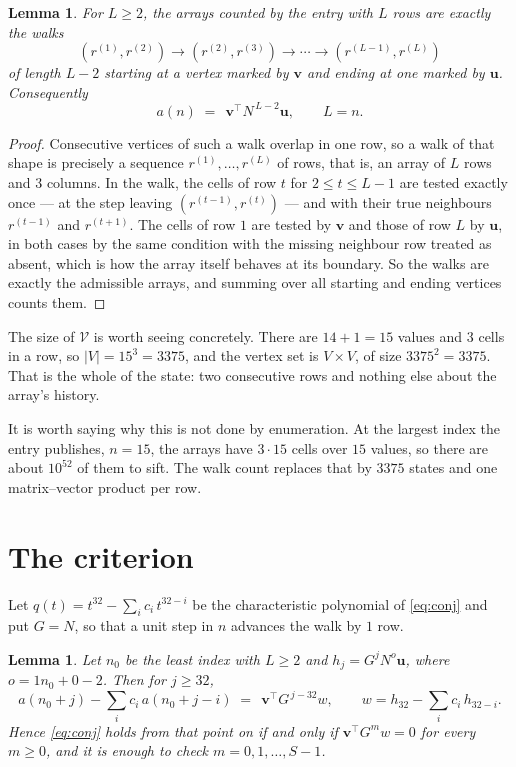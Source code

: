 \documentclass[11pt,a4paper]{article}
\theoremstyle{plain}
\newtheorem{lemma}[theorem]{Lemma}
\theoremstyle{definition}
\begin{document}
\begin{lemma}\label{lem:walk}
For $L\ge2$, the arrays counted by the entry with $L$ rows are exactly the walks
\[
(r^{(1)},r^{(2)})\to(r^{(2)},r^{(3)})\to\cdots\to(r^{(L-1)},r^{(L)})
\]
of length $L-2$ starting at a vertex marked by $\mathbf{v}$ and ending at one marked by
$\mathbf{u}$. Consequently
\[
a(n)\;=\;\,\mathbf{v}^{\!\top}N^{\,L-2}\mathbf{u},\qquad L=n .
\]
\end{lemma}

\begin{proof}
Consecutive vertices of such a walk overlap in one row, so a walk of that shape is
precisely a sequence $r^{(1)},\dots,r^{(L)}$ of rows, that is, an array of $L$ rows
and $3$ columns. In the walk, the cells of row $t$ for $2\le t\le L-1$ are tested
exactly once --- at the step leaving $(r^{(t-1)},r^{(t)})$ --- and with their true
neighbours $r^{(t-1)}$ and $r^{(t+1)}$. The cells of row $1$ are tested by
$\mathbf{v}$ and those of row $L$ by $\mathbf{u}$, in both cases by the same condition
with the missing neighbour row treated as absent, which is how the array itself behaves at
its boundary. So the walks are exactly the admissible arrays, and summing over all starting
and ending vertices counts them.
\end{proof}


The size of $\mathcal V$ is worth seeing concretely. There are $14+1=15$ values
and $3$ cells in a row, so $|V|=15^{3}=3375$, and the vertex set is
$V\times V$, of size $3375^2=3375$. That is the whole of the state: two consecutive
rows and nothing else about the array's history.

It is worth saying why this is not done by enumeration. At the largest index the entry
publishes, $n=15$, the arrays have $3\cdot15$ cells over
$15$ values, so there are about $10^{52}$ of them to sift. The
walk count replaces that by $3375$ states and one matrix--vector product per row.
\section{The criterion}

Let $q(t)=t^{32}-\sum_i c_i\,t^{32-i}$ be the characteristic polynomial of
\eqref{eq:conj} and put $G=N$, so that a unit step in $n$ advances the walk by
$1$ row.

\begin{lemma}\label{lem:crit}
Let $n_0$ be the least index with $L\ge2$ and $h_j=G^{j}N^{o}\mathbf{u}$, where
$o=1n_0+0-2$. Then for $j\ge32$,
\[
a(n_0+j)-\sum_i c_i\,a(n_0+j-i)\;=\;\,\mathbf{v}^{\!\top}G^{\,j-32}w,
\qquad w=h_{32}-\sum_i c_i\,h_{32-i} .
\]
Hence \eqref{eq:conj} holds from that point on if and only if
$\mathbf{v}^{\!\top}G^{m}w=0$ for every $m\ge0$, and it is enough to check
$m=0,1,\dots,S-1$.
\end{lemma}
\end{document}
